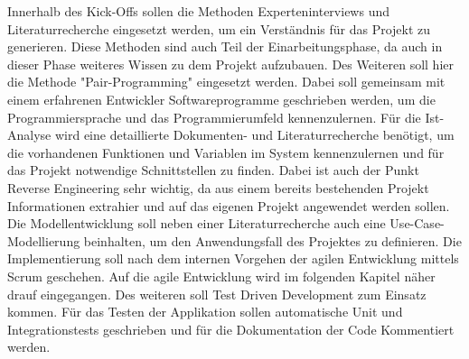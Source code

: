 Innerhalb des Kick-Offs sollen die Methoden Experteninterviews und Literaturrecherche eingesetzt werden, um ein Verständnis für das Projekt zu generieren. Diese Methoden sind 
auch Teil der Einarbeitungsphase, da auch in dieser Phase weiteres Wissen zu dem Projekt 
aufzubauen. Des Weiteren soll hier die Methode "Pair-Programming" eingesetzt werden. Dabei
soll gemeinsam mit einem erfahrenen Entwickler Softwareprogramme geschrieben werden, um die 
Programmiersprache und das Programmierumfeld kennenzulernen. Für die Ist-Analyse wird eine
detaillierte Dokumenten- und Literaturrecherche benötigt, um die vorhandenen Funktionen und 
Variablen im System kennenzulernen und für das Projekt notwendige Schnittstellen zu finden. 
Dabei ist auch der Punkt Reverse Engineering sehr wichtig, da aus einem bereits bestehenden 
Projekt Informationen extrahier und auf das eigenen Projekt angewendet werden sollen. 
Die Modellentwicklung soll neben einer Literaturrecherche auch eine Use-Case-Modellierung
beinhalten, um den Anwendungsfall des Projektes zu definieren. Die Implementierung soll nach
dem internen Vorgehen der agilen Entwicklung mittels Scrum geschehen. Auf die agile Entwicklung
wird im folgenden Kapitel näher drauf eingegangen. Des weiteren soll Test Driven Development
zum Einsatz kommen. Für das Testen der Applikation sollen automatische Unit und Integrationstests geschrieben und für die Dokumentation der Code Kommentiert werden.